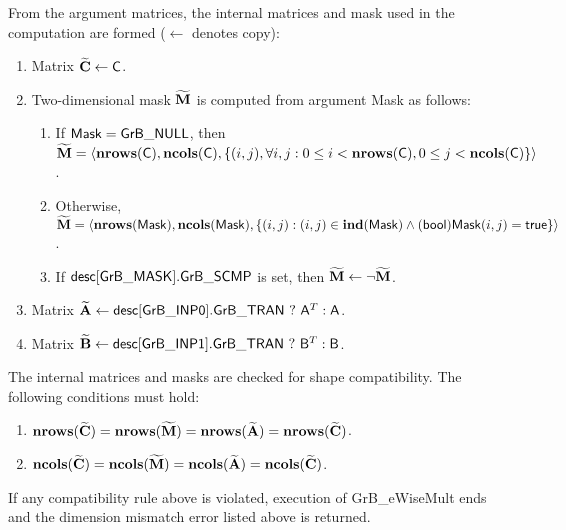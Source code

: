 From the argument matrices, the internal matrices and mask used in the computation are formed ($\leftarrow$ denotes copy):
\begin{enumerate}
	\item Matrix ${\bf \widetilde{C}} \leftarrow {\sf C}$.

	\item Two-dimensional mask ${\bf \widetilde{M}}$ is computed from argument {\sf Mask} as follows:
	\begin{enumerate}

		\item	If ${\sf Mask} = {\sf GrB\_NULL}$, then ${\bf \widetilde{M}} = \langle \bold{nrows}({\sf C}), \bold{ncols}({\sf C}), \{(i,j), \forall i,j : 0 \leq i <  \bold{nrows}({\sf C}), 0 \leq j < \bold{ncols}({\sf C}) \} \rangle$.

		\item	Otherwise, ${\bf \widetilde{M}} = \langle \bold{nrows}({\sf Mask}), 
        \bold{ncols}({\sf Mask}), \{(i,j) : (i,j) \in \bold{ind}({\sf Mask}) \wedge 
        ({\sf bool}){\sf Mask}(i,j) = {\sf true}\} \rangle$.

		\item	If ${\sf desc[GrB\_MASK].GrB\_SCMP}$ is set, then ${\bf \widetilde{M}} \leftarrow \neg {\bf \widetilde{M}}$.

	\end{enumerate}

	\item Matrix ${\bf \widetilde{A}} \leftarrow {\sf desc[GrB\_INP0].GrB\_TRAN} \ ? \ {\sf A}^T : {\sf A}$.

	\item Matrix ${\bf \widetilde{B}} \leftarrow {\sf desc[GrB\_INP1].GrB\_TRAN} \ ? \ {\sf B}^T : {\sf B}$.
\end{enumerate}

The internal matrices and masks are checked for shape compatibility. The following conditions must hold:
\begin{enumerate}	
	\item $\bold{nrows}({\bf \widetilde{C}}) = \bold{nrows}({\bf \widetilde{M}})
	     = \bold{nrows}({\bf \widetilde{A}}) = \bold{nrows}({\bf \widetilde{C}})$.

	\item $\bold{ncols}({\bf \widetilde{C}}) = \bold{ncols}({\bf \widetilde{M}})
	     = \bold{ncols}({\bf \widetilde{A}}) = \bold{ncols}({\bf \widetilde{C}})$.
\end{enumerate}
If any compatibility rule above is violated, execution of {\sf GrB\_eWiseMult} ends and the dimension mismatch error listed above is returned.

